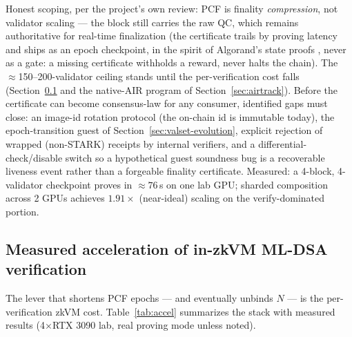 \documentclass[11pt]{article}
\theoremstyle{plain}
\theoremstyle{definition}
\theoremstyle{remark}
\begin{document}
Honest scoping, per the project's own review: PCF is finality
\emph{compression}, not validator scaling --- the block still carries the
raw QC, which remains authoritative for real-time finalization (the
certificate trails by proving latency and ships as an epoch checkpoint, in
the spirit of Algorand's state proofs \cite{compactcerts2020}, never as a
gate: a missing certificate withholds a reward, never halts the chain).
The $\approx$150--200-validator ceiling stands until the per-verification
cost falls (Section~\ref{sec:accel} and the native-AIR program of
Section~\ref{sec:airtrack}). Before the
certificate can become consensus-law for any consumer, identified gaps must
close: an image-id rotation protocol (the on-chain id is immutable today),
the epoch-transition guest of Section~\ref{sec:valset-evolution}, explicit
rejection of wrapped (non-STARK) receipts by internal verifiers, and a
differential-check/disable switch so a hypothetical guest soundness bug is
a recoverable liveness event rather than a forgeable finality certificate.
Measured: a 4-block, 4-validator checkpoint proves in $\approx 76$\,s on one
lab GPU; sharded composition across 2 GPUs achieves $1.91\times$
(near-ideal) scaling on the verify-dominated portion.

\subsection{Measured acceleration of in-zkVM ML-DSA verification}
\label{sec:accel}

The lever that shortens PCF epochs --- and eventually unbinds $N$ --- is the
per-verification zkVM cost. Table~\ref{tab:accel} summarizes the stack with
measured results (4$\times$RTX 3090 lab, real proving mode unless noted).
\end{document}
